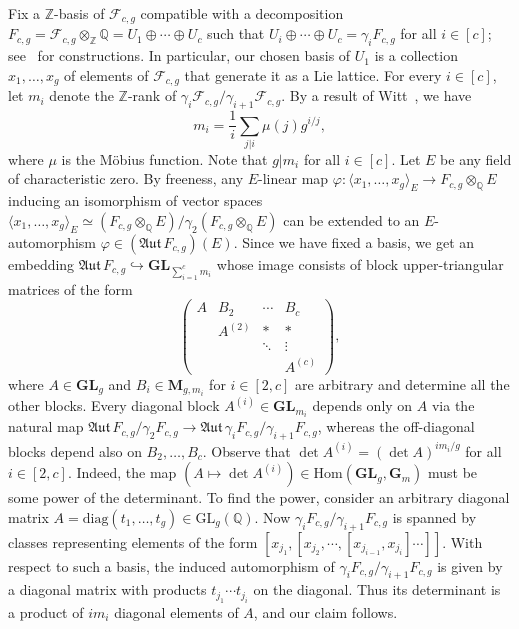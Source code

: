 \documentclass[11pt,a4paper]{amsart}
\theoremstyle{plain}
\theoremstyle{remark}
\newcommand{\Z}{\mathbb{Z}}
\newcommand{\Q}{\mathbb{Q}}
\newcommand{\tensor}{\otimes}
\def \aAut {\mathfrak{Aut} \,}
\begin{document}
Fix a $\Z$-basis of $\mathcal{F}_{c,g}$ compatible with a decomposition $F_{c,g} = \mathcal{F}_{c,g} \tensor_\Z \Q = U_1 \oplus \cdots \oplus U_c$ such that $U_i \oplus \cdots \oplus U_c = \gamma_i F_{c,g}$ for all $i \in [c]$; see~\cite[\S 5]{Hall/69} for constructions.  In particular, our chosen basis of $U_1$ is a collection $x_1, \dots, x_g$ of elements of $\mathcal{F}_{c,g}$ that generate it as a Lie lattice.
For every $i \in [c]$, let $m_i$ denote the $\Z$-rank of $\gamma_i \mathcal{F}_{c,g} / \gamma_{i+1} \mathcal{F}_{c,g}$.  By a result of Witt~\cite[Theorem~5.7]{Hall/69}, we have
$$ m_i = \frac{1}{i} \sum_{j | i} \mu(j) g^{i/j},$$
where $\mu$ is the M\"{o}bius function.  Note that $g | m_i$ for all $i \in [c]$.   
Let $E$ be any field of characteristic zero.  By freeness, any $E$-linear map $\varphi : \langle x_1, \dots, x_g \rangle_E \to F_{c,g} \tensor_\Q E$ inducing an isomorphism of vector spaces $\langle x_1, \dots, x_g \rangle_E \simeq (F_{c,g} \tensor_\Q E)/\gamma_2 (F_{c,g} \tensor_\Q E)$ can be extended to an $E$-automorphism $\varphi \in (\aAut F_{c,g})(E)$.  Since we have fixed a basis, we get an embedding $\aAut F_{c,g} \hookrightarrow \mathbf{GL}_{\sum_{i = 1}^c m_i}$ whose image consists of block upper-triangular matrices of the form
$$ \left( \begin{array}{cccc}
A & B_2 & \cdots & B_c \\
& A^{(2)} & \ast & \ast \\
& & \ddots & \vdots \\
& & & A^{(c)} 
\end{array} \right),$$
where $A \in \mathbf{GL}_g$ and $B_i \in \mathbf{M}_{g, m_i}$ for $i \in [2,c]$ are arbitrary and determine all the other blocks.  Every diagonal block $A^{(i)} \in \mathbf{GL}_{m_i}$ depends only on $A$ via the natural map $\aAut F_{c,g} / \gamma_2 F_{c,g} \to \aAut \gamma_i F_{c,g} / \gamma_{i+1} F_{c,g}$, whereas the off-diagonal blocks depend also on $B_2, \dots, B_c$.  Observe that $\det A^{(i)} = (\det A)^{i m_i / g}$ for all $i \in [2,c]$.  Indeed, the map $(A \mapsto \det A^{(i)}) \in \mathrm{Hom}(\mathbf{GL}_g, \mathbf{G}_m)$ must be some power of the determinant.  To find the power, consider an arbitrary diagonal matrix $A = \mathrm{diag}(t_1, \dots, t_g) \in \mathrm{GL}_g(\Q)$.  Now $\gamma_i F_{c,g} / \gamma_{i+1} F_{c,g}$ is spanned by classes representing elements of the form $[x_{j_1}, [x_{j_2}, \cdots, [x_{j_{i-1}}, x_{j_i}] \cdots ]]$.  With respect to such a basis, the induced automorphism of $\gamma_i F_{c,g} / \gamma_{i+1} F_{c,g}$ is given by a diagonal matrix with products $t_{j_1} \cdots t_{j_i}$ on the diagonal.  Thus its determinant is a product of $i m_i$ diagonal elements of $A$, and our claim follows.
\end{document}
